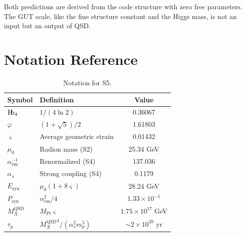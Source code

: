 \documentclass[11pt,a4paper]{article}
\theoremstyle{definition}
\theoremstyle{remark}
\newcommand{\Hb}{\textnormal{H\kern-0.3em b}}
\newcommand{\Hbfour}{\Hb_4}
\newcommand{\strain}{\varsigma}
\newcommand{\gr}{\varphi}
\newcommand{\murad}{\mu_0}
\newcommand{\Mpl}{M_{\mathrm{Pl}}}
\newcommand{\MX}{{M_X^{\mathrm{QSD}}}}
\newcommand{\Esyn}{E_{\mathrm{syn}}}
\newcommand{\Psyn}{P_{\mathrm{syn}}}
\newcommand{\aem}{\alpha_{\mathrm{em}}}
\begin{document}
Both predictions are derived from the code structure with zero free parameters. The GUT scale, like the fine structure constant and the Higgs mass, is not an input but an output of QSD.

\section{Notation Reference}
\label{sec:notation}

\begin{table}[H]
\centering
\begin{tabular}{llc}
\toprule
\textbf{Symbol} & \textbf{Definition} & \textbf{Value} \\
\midrule
$\Hbfour$ & $1/(4\ln 2)$ & 0.36067 \\
$\gr$ & $(1+\sqrt{5})/2$ & 1.61803 \\
$\strain$ & Average geometric strain & 0.01432 \\
$\murad$ & Radion mass (S2) & 25.34 GeV \\
$\aem^{-1}$ & Renormalized (S4) & 137.036 \\
$\alpha_s$ & Strong coupling (S4) & 0.1179 \\
$\Esyn$ & $\murad(1+8\strain)$ & 28.24 GeV \\
$\Psyn$ & $\aem^2/4$ & $1.33 \times 10^{-5}$ \\
$\MX$ & $\Mpl\strain$ & $1.75 \times 10^{17}$ GeV \\
$\tau_p$ & $\MX^4/(\alpha_s^2 m_p^5)$ & $\sim 2 \times 10^{39}$ yr \\
\bottomrule
\end{tabular}
\caption{Notation for S5.}
\label{tab:notation_ref}
\end{table}




\end{document}
